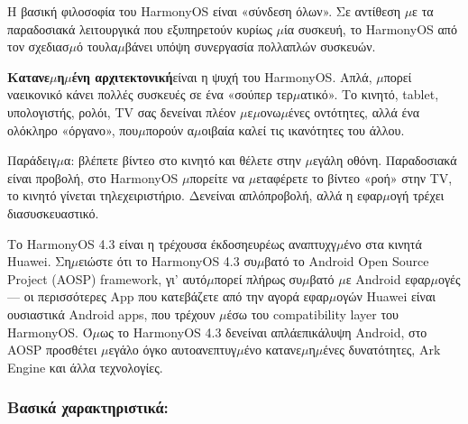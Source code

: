 


Η βασική φιλοσοφία του HarmonyOS είναι «σύνδεση όλων». Σε αντίθεση $\mu$ε τα παραδοσιακά λειτουργικά που εξυπηρετούν κυρίως $\mu$ία συσκευή, το HarmonyOS από τον σχεδιασ$\mu$ό τουλα$\mu$βάνει υπόψη συνεργασία πολλαπλών συσκευών.

\textbf{Κατανε$\mu$η$\mu$ένη αρχιτεκτονική}είναι η ψυχή του HarmonyOS. Απλά, $\mu$πορεί ναεικονικό κάνει πολλές συσκευές σε ένα «σούπερ τερ$\mu$ατικό». Το κινητό, tablet, υπολογιστής, ρολόι, TV σας δενείναι πλέον $\mu$ε$\mu$ονω$\mu$ένες οντότητες, αλλά ένα ολόκληρο «όργανο», που$\mu$πορούν α$\mu$οιβαία καλεί τις ικανότητες του άλλου.

Παράδειγ$\mu$α: βλέπετε βίντεο στο κινητό και θέλετε στην $\mu$εγάλη οθόνη. Παραδοσιακά είναι προβολή, στο HarmonyOS $\mu$πορείτε να $\mu$εταφέρετε το βίντεο «ροή» στην TV, το κινητό γίνεται τηλεχειριστήριο. Δενείναι απλόπροβολή, αλλά η εφαρ$\mu$ογή τρέχει διασυσκευαστικό.


Το HarmonyOS 4.3 είναι η τρέχουσα έκδοσηευρέως αναπτυχγ$\mu$ένο στα κινητά Huawei. Ση$\mu$ειώστε ότι το HarmonyOS 4.3 συ$\mu$βατό το Android Open Source Project (AOSP) framework, γι' αυτό$\mu$πορεί πλήρως συ$\mu$βατό $\mu$ε Android εφαρ$\mu$ογές — οι περισσότερες App που κατεβάζετε από την αγορά εφαρ$\mu$ογών Huawei είναι ουσιαστικά Android apps, που τρέχουν $\mu$έσω του compatibility layer του HarmonyOS. Ό$\mu$ως το HarmonyOS 4.3 δενείναι απλάεπικάλυψη Android, στο AOSP προσθέτει $\mu$εγάλο όγκο αυτοανεπτυγ$\mu$ένο κατανε$\mu$η$\mu$ένες δυνατότητες, Ark Engine και άλλα τεχνολογίες.

\subsubsection*{Βασικά χαρακτηριστικά:}

